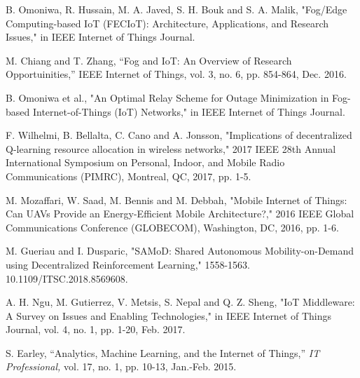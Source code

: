 \documentclass[journal]{IEEEtran}
\begin{document}
%
%
%
\begin{thebibliography}{1}
B. Omoniwa, R. Hussain, M. A. Javed, S. H. Bouk and S. A. Malik, "Fog/Edge Computing-based IoT (FECIoT): Architecture, Applications, and Research Issues," in IEEE Internet of Things Journal.

M. Chiang and T. Zhang, ``Fog and IoT: An Overview of Research Opportuinities,'' IEEE Internet of Things, vol. 3, no. 6, pp. 854-864, Dec.
2016.

B. Omoniwa et al., "An Optimal Relay Scheme for Outage Minimization in Fog-based Internet-of-Things (IoT) Networks," in IEEE Internet of Things Journal.

F. Wilhelmi, B. Bellalta, C. Cano and A. Jonsson, "Implications of decentralized Q-learning resource allocation in wireless networks," 2017 IEEE 28th Annual International Symposium on Personal, Indoor, and Mobile Radio Communications (PIMRC), Montreal, QC, 2017, pp. 1-5.

M. Mozaffari, W. Saad, M. Bennis and M. Debbah, "Mobile Internet of Things: Can UAVs Provide an Energy-Efficient Mobile Architecture?," 2016 IEEE Global Communications Conference (GLOBECOM), Washington, DC, 2016, pp. 1-6.

M. Gueriau and I. Dusparic, "SAMoD: Shared Autonomous Mobility-on-Demand using Decentralized Reinforcement Learning,"  1558-1563. 10.1109/ITSC.2018.8569608.

A. H. Ngu, M. Gutierrez, V. Metsis, S. Nepal and Q. Z. Sheng, "IoT Middleware: A Survey on Issues and Enabling Technologies," in IEEE Internet of Things Journal, vol. 4, no. 1, pp. 1-20, Feb. 2017.


S. Earley, ``Analytics, Machine Learning, and the Internet of Things,'' \emph{IT Professional,} vol. 17, no. 1, pp. 10-13, Jan.-Feb. 2015.


\end{thebibliography}
\end{document}
